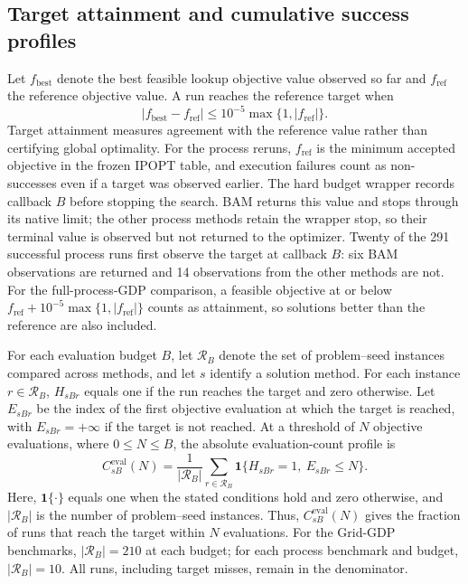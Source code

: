 \documentclass{article}
\begin{document}
\subsection{Target attainment and cumulative success profiles}
\label{sec:metrics}
Let $f_{\mathrm{best}}$ denote the best feasible lookup objective value observed so far and $f_{\mathrm{ref}}$ the reference objective value.
A run reaches the reference target when
\begin{equation}\label{eqn:target}
 |f_{\mathrm{best}}-f_{\mathrm{ref}}|
 \leq 10^{-5}\max\{1,|f_{\mathrm{ref}}|\}.
\end{equation}
Target attainment measures agreement with the reference value rather than certifying global optimality.
For the process reruns, $f_{\mathrm{ref}}$ is the minimum accepted objective in the frozen IPOPT table, and execution failures count as non-successes even if a target was observed earlier.
The hard budget wrapper records callback $B$ before stopping the search. BAM returns this value and stops through its native limit; the other process methods retain the wrapper stop, so their terminal value is observed but not returned to the optimizer. Twenty of the 291 successful process runs first observe the target at callback $B$: six BAM observations are returned and 14 observations from the other methods are not.
For the full-process-GDP comparison, a feasible objective at or below $f_{\mathrm{ref}}+10^{-5}\max\{1,|f_{\mathrm{ref}}|\}$ counts as attainment, so solutions better than the reference are also included.

For each evaluation budget $B$, let $\mathcal R_B$ denote the set of problem--seed instances compared across methods, and let $s$ identify a solution method.
For each instance $r\in\mathcal R_B$, $H_{sBr}$ equals one if the run reaches the target and zero otherwise.
Let $E_{sBr}$ be the index of the first objective evaluation at which the target is reached, with $E_{sBr}=+\infty$ if the target is not reached.
At a threshold of $N$ objective evaluations, where $0\leq N\leq B$, the absolute evaluation-count profile is
\begin{equation}\label{eqn:absolute-evaluations}
 C^{\mathrm{eval}}_{sB}(N)
 =\frac{1}{|\mathcal R_B|}\sum_{r\in\mathcal R_B}
 \mathbf{1}\{H_{sBr}=1,\ E_{sBr}\leq N\}.
\end{equation}
Here, $\mathbf{1}\{\cdot\}$ equals one when the stated conditions hold and zero otherwise, and $|\mathcal R_B|$ is the number of problem--seed instances.
Thus, $C^{\mathrm{eval}}_{sB}(N)$ gives the fraction of runs that reach the target within $N$ evaluations.
For the Grid-GDP benchmarks, $|\mathcal R_B|=210$ at each budget; for each process benchmark and budget, $|\mathcal R_B|=10$.
All runs, including target misses, remain in the denominator.
\end{document}
